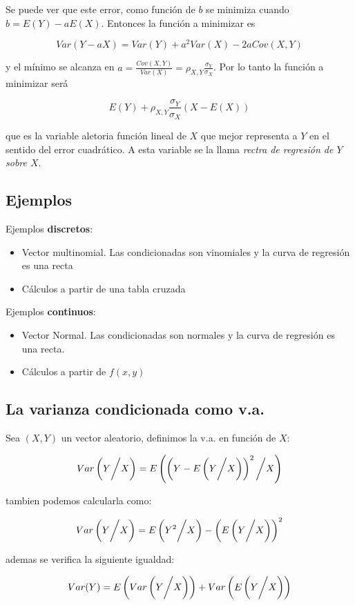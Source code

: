 \documentclass{article}
\begin{document}
Se puede ver que este error, como función de $b$ se minimiza cuando $b = E(Y) - aE(X)$. Entonces la función a minimizar es

\[ Var(Y - aX) = Var(Y) + a^2Var(X) - 2aCov(X,Y) \]

y el mínimo se alcanza en $a = \frac{Cov(X,Y)}{Var(X)} = \rho_{X,Y}\frac{\sigma_Y}{\sigma_X}$. Por lo tanto la función a minimizar será

\[ E(Y) + \rho_{X,Y}\frac{\sigma_Y}{\sigma_X}(X - E(X)) \]

que es la variable aletoria función lineal de $X$ que mejor representa a $Y$ en el sentido del error cuadrático. A esta variable
se la llama \textit{rectra de regresión de $Y$ sobre $X$}.

\subsection{Ejemplos}

Ejemplos \textbf{discretos}:
\begin{itemize}
    \item Vector multinomial. Las condicionadas son vinomiales y la curva de regresión es una recta
    \item Cálculos a partir de una tabla cruzada
\end{itemize}
Ejemplos \textbf{continuos}:
\begin{itemize}
    \item Vector Normal. Las condicionadas son normales y la curva de regresión es una recta.
    \item Cálculos a partir de $f(x,y)$
\end{itemize}

\subsection{La varianza condicionada como v.a.}

Sea $(X,Y)$ un vector aleatorio, definimos la v.a. en función de $X$:

\[ Var\left( Y \bigg{/} X \right) = E\left( \left( Y - E \left( Y \bigg{/} X \right) \right)^2 \bigg{/} X \right)\]

tambien podemos calcularla como:

\[ Var\left( Y \bigg{/} X \right) = E\left( Y^2 \bigg{/} X \right) - \left( E\left( Y \bigg{/} X \right) \right)^2 \]

ademas se verifica la siguiente igualdad:

\[ Var(Y) = E\left( Var\left( Y \bigg{/} X \right) \right) + Var\left( E\left( Y \bigg{/} X \right) \right) \]
\end{document}
